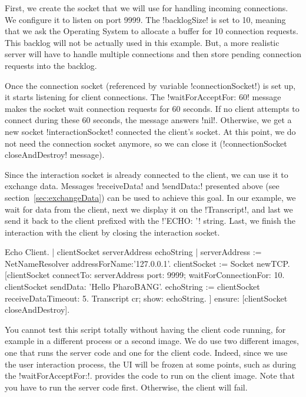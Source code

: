 \documentclass[a4paper,10pt,twoside]{book}
\begin{document}
First, we create the socket that we will use for handling incoming connections.
We configure it to listen on port 9999.
The \ct!backlogSize! is set to 10, meaning that we ask the Operating System to allocate a buffer for 10 connection requests. 
This backlog will not be actually used in this example.
But, a more realistic server will have to handle multiple connections and then store pending connection requests into the backlog.

Once the connection socket (referenced by variable \ct!connectionSocket!) is set up, it starts listening for client connections.
The \ct!waitForAcceptFor: 60! message makes the socket wait connection requests for 60 seconds.
If no client attempts to connect during these 60 seconds, the message answers \ct!nil!.
Otherwise, we get a new socket \ct!interactionSocket! connected the client's socket.
At this point, we do not need the connection socket anymore, so we can close it (\ct!connectionSocket closeAndDestroy! message).

Since the interaction socket is already connected to the client, we can use it to exchange data.
Messages \ct!receiveData! and \ct!sendData:! presented above (see section~\ref{sec:exchangeData}) can be used to achieve this goal.
In our example, we wait for data from the client, next we display it on the \ct!Transcript!, and last we send it back to the client prefixed with the \ct!'ECHO: '! string.
Last, we finish the interaction with the client by closing the interaction socket.

\begin{script}[echoClient]{Echo Client.}
| clientSocket serverAddress echoString |
serverAddress := NetNameResolver addressForName:'127.0.0.1'.
clientSocket := Socket newTCP.
[clientSocket 
	connectTo: serverAddress port: 9999;
	waitForConnectionFor: 10.
 clientSocket sendData: 'Hello PharoBANG'.
 echoString  := clientSocket receiveDataTimeout: 5.
 Transcript cr; show: echoString.
] ensure: [clientSocket closeAndDestroy].
\end{script}


You cannot test this script totally without having the client code running, for example in a different process or a second image. 
We do use two different images, one that runs the server code and one for the client code. 
Indeed, since we use the user interaction process, the \pharo UI will be frozen at some points, such as during the \ct!waitForAcceptFor:!.
 provides the code to run on the client image.
Note that you have to run the server code first.
Otherwise, the client will fail.
\end{document}
